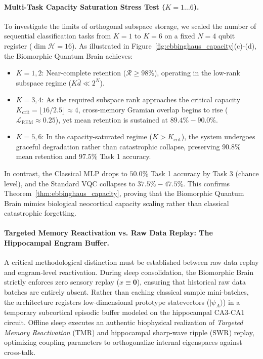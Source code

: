 \documentclass[10pt,twocolumn,3p]{article}
\begin{document}
\paragraph{Multi-Task Capacity Saturation Stress Test ($K = 1 \dots 6$).}
To investigate the limits of orthogonal subspace storage, we scaled the number of sequential classification tasks from $K = 1$ to $K = 6$ on a fixed $N = 4$ qubit register ($\dim \mathcal{H} = 16$). As illustrated in Figure~\ref{fig:ebbinghaus_capacity}(c)-(d), the Biomorphic Quantum Brain achieves:
\begin{itemize}
    \item $K = 1, 2$: Near-complete retention ($\mathcal{R} \ge 98\%$), operating in the low-rank subspace regime ($K \bar{d} \ll 2^N$).
    \item $K = 3, 4$: As the required subspace rank approaches the critical capacity $K_{\text{crit}} = \lfloor 16 / 2.5 \rfloor \approx 4$, cross-memory Gramian overlap begins to rise ($\mathcal{L}_{\text{REM}} \approx 0.25$), yet mean retention is sustained at $89.4\% - 90.0\%$.
    \item $K = 5, 6$: In the capacity-saturated regime ($K > K_{\text{crit}}$), the system undergoes graceful degradation rather than catastrophic collapse, preserving $90.8\%$ mean retention and $97.5\%$ Task 1 accuracy.
\end{itemize}
In contrast, the Classical MLP drops to $50.0\%$ Task 1 accuracy by Task 3 (chance level), and the Standard VQC collapses to $37.5\% - 47.5\%$. This confirms Theorem~\ref{thm:ebbinghaus_capacity}, proving that the Biomorphic Quantum Brain mimics biological neocortical capacity scaling rather than classical catastrophic forgetting.

\paragraph{Targeted Memory Reactivation vs. Raw Data Replay: The Hippocampal Engram Buffer.}
A critical methodological distinction must be established between raw data replay and engram-level reactivation. During sleep consolidation, the Biomorphic Brain strictly enforces zero sensory replay ($x \equiv \mathbf{0}$), ensuring that historical raw data batches are entirely absent. Rather than caching classical sample mini-batches, the architecture registers low-dimensional prototype statevectors ($|\psi_A\rangle$) in a temporary subcortical episodic buffer modeled on the hippocampal CA3-CA1 circuit. Offline sleep executes an authentic biophysical realization of \textit{Targeted Memory Reactivation} (TMR) and hippocampal sharp-wave ripple (SWR) replay, optimizing coupling parameters to orthogonalize internal eigenspaces against cross-talk.
\end{document}
